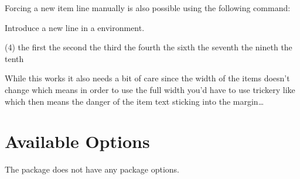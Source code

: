 \documentclass[load-preamble+]{cnltx-doc}
\begin{document}
Forcing a new item line manually is also possible using the
following command:
\begin{commands}
    Introduce a new line in a  environment.
\end{commands}
\begin{example}
  \begin{tasks}(4)
    \task the first
    \task the second
    \task the third
    \task the fourth
    \task {}
      \startnewitemline 
    \task the sixth
    \task the seventh
    \task {} \startnewitemline
    \task the nineth
    \task the tenth
  \end{tasks}
\end{example}

While this works it also needs a bit of care since the width of the items
doesn't change which means in order to use the full width you'd have to use
trickery like  which then means the danger of the item text sticking
into the margin\ldots

\section{Available Options}\label{sec:tasks:options}

The \Tasks{} package does not have any package options.
\end{document}
